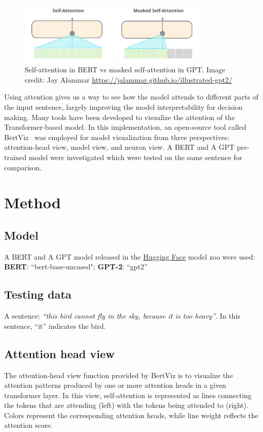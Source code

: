 \documentclass[]{article}
\begin{document}
\begin{figure}[!h]
    \centering
        \includegraphics[width=0.8\textwidth]{FIGS/self-attention-and-masked-self-attention.png}
    \caption{Self-attention in BERT vs masked self-attention in GPT. Image credit: Jay Alammar \href{https://jalammar.github.io/illustrated-gpt2/}{https://jalammar.github.io/illustrated-gpt2/}}
    \label{fig:bert2gpt}
\end{figure}

Using attention gives us a way to see how the model attends to different parts of the input sentence, largely improving the model interpretability for decision making. 
Many tools have been developed to visualize the attention of the Transformer-based model. 
In this implementation, an open-source tool called BertViz~\cite{vig2019bertviz} was employed for model visualization from three perspectives: attention-head view, model view, and neuron view. 
A BERT and A GPT pre-trained model were investigated which were tested on the same sentence for comparison.


\section{Method}
\subsection{Model}
A BERT and A GPT model released in the \href{https://huggingface.co/models?sort=downloads&search=bert}{Hugging Face} model zoo were used:
\textbf{BERT}: ``bert-base-uncased";
\textbf{GPT-2}: ``gpt2''

\subsection{Testing data}
A sentence: \textit{``this bird cannot fly in the sky, because it is too heavy''}. In this sentence, ``it'' indicates the bird. 

\subsection{Attention head view}
\label{sec:head}
The attention-head view function provided by BertViz is to visualize the attention patterns produced by one or more attention heads in a given transformer layer. 
In this view, self-attention is represented as lines connecting the tokens that are attending (left) with the tokens being attended to (right). 
Colors represent the corresponding attention heads, while line weight reflects the attention score.
\end{document}

